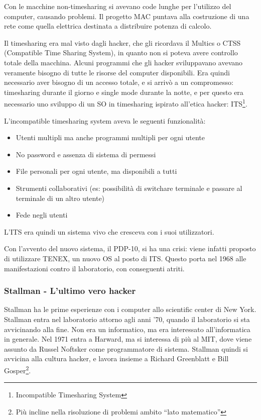 Con le macchine non-timesharing si avevano code lunghe per l'utilizzo del computer, causando problemi. Il progetto MAC puntava alla costruzione di una rete come quella elettrica destinata a distribuire potenza di calcolo.

Il timesharing era mal visto dagli hacker, che gli ricordava il Multics o CTSS (Compatible Time Sharing System), in quanto non si poteva avere controllo totale della macchina. Alcuni programmi che gli hacker sviluppavano avevano veramente bisogno di tutte le risorse del computer disponibili. Era quindi necessario aver bisogno di un accesso totale, e si arriv\`o a un compromesso: timesharing durante il giorno e single mode durante la notte, e per questo era necessario uno sviluppo di un SO in timesharing ispirato all'etica hacker: ITS\footnote{Incompatible Timesharing System}.

L'incompatible timesharing system aveva le seguenti funzionalit\`a:
\begin{itemize}

\item Utenti multipli ma anche programmi multipli per ogni utente
\item No password e assenza di sistema di permessi
\item File personali per ogni utente, ma disponibili a tutti
\item Strumenti collaborativi (es: possibilit\`a di switchare terminale e passare al terminale di un altro utente)
\item Fede negli utenti

\end{itemize}

L'ITS era quindi un sistema vivo che cresceva  con i suoi utilizzatori.

Con l'avvento del nuovo sistema, il PDP-10, si ha una crisi: viene infatti proposto di utilizzare TENEX, un nuovo OS al posto di ITS. Questo porta nel 1968 alle manifestazioni contro il laboratorio, con conseguenti atriti.

\subsubsection{Stallman - L'ultimo vero hacker}

Stallman ha le prime esperienze con i computer allo scientific center di New York. Stallman entra nel laboratorio attorno agli anni '70, quando il laboratorio si sta avvicinando alla fine. Non era un informatico, ma era interessato all'informatica in generale. Nel 1971 entra a Harward, ma si interessa di pi\`u al MIT, dove viene assunto da Russel Noftsker come programmatore di sistema. Stallman quindi si avvicina alla cultura hacker, e lavora insieme a Richard Greenblatt e Bill Gosper\footnote{Pi\`u incline nella risoluzione di problemi ambito ``lato matematico''}.

